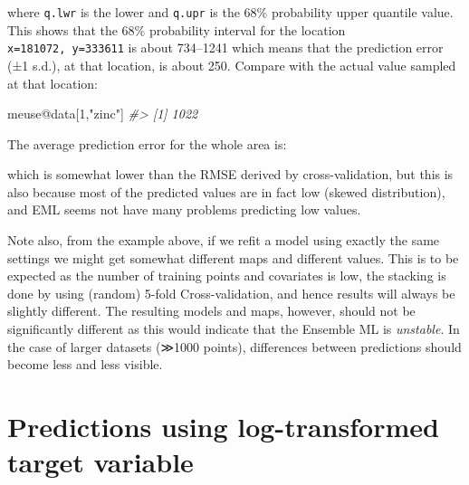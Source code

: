 \documentclass[
  graybox,natbib,nospthms]{svmono}
\newenvironment{Shaded}{\begin{snugshade}}{\end{snugshade}}
\newcommand{\CommentTok}[1]{\textcolor[rgb]{0.37,0.37,0.37}{\textit{#1}}}
\newcommand{\DecValTok}[1]{\textcolor[rgb]{0.06,0.06,0.06}{#1}}
\newcommand{\FunctionTok}[1]{\textcolor[rgb]{0,0,0}{#1}}
\newcommand{\NormalTok}[1]{#1}
\newcommand{\SpecialCharTok}[1]{\textcolor[rgb]{0,0,0}{#1}}
\newcommand{\StringTok}[1]{\textcolor[rgb]{0.5,0.5,0.5}{#1}}
\begin{document}
where \texttt{q.lwr} is the lower and \texttt{q.upr} is the 68\% probability upper quantile value. This shows that the 68\% probability interval for the location \texttt{x=181072,\ y=333611} is about 734--1241 which means that the prediction error (±1 s.d.), at that location, is about 250. Compare with the actual value sampled at that location:

\begin{Shaded}
\begin{Highlighting}[]
\NormalTok{meuse}\SpecialCharTok{@}\NormalTok{data[}\DecValTok{1}\NormalTok{,}\StringTok{"zinc"}\NormalTok{]}
\CommentTok{\#\textgreater{} [1] 1022}
\end{Highlighting}
\end{Shaded}

The average prediction error for the whole area is:

\begin{Shaded}
\end{Shaded}

which is somewhat lower than the RMSE derived by cross-validation, but this is
also because most of the predicted values are in fact low (skewed distribution),
and EML seems not have many problems predicting low values.

Note also, from the example above, if we refit a model using exactly the same
settings we might get somewhat different maps and different values. This is to
be expected as the number of training points and covariates is low, the stacking
is done by using (random) 5-fold Cross-validation, and hence results will always
be slightly different. The resulting models and maps, however, should not be
significantly different as this would indicate that the Ensemble ML is \emph{unstable}.
In the case of larger datasets (≫1000 points), differences between predictions
should become less and less visible.

\hypertarget{predictions-using-log-transformed-target-variable}{%
\section{Predictions using log-transformed target variable}\label{predictions-using-log-transformed-target-variable}}
\end{document}
